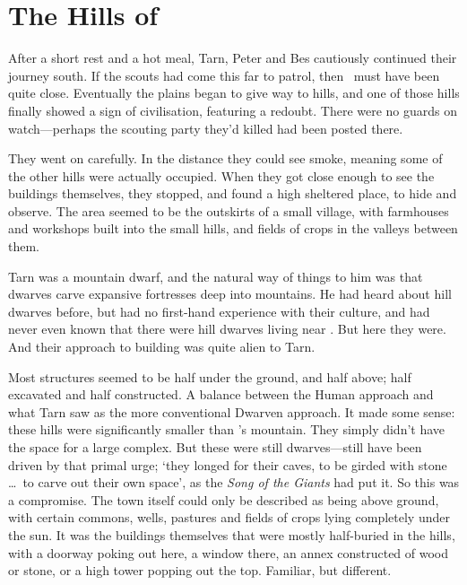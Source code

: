 \chapter{The Hills of \tholkunrond}

After a short rest and a hot meal, Tarn, Peter and Bes cautiously continued their journey south.  If the scouts had come this far to patrol, then \tholkunrond\ must have been quite close.  Eventually the plains began to give way to hills, and one of those hills finally showed a sign of civilisation, featuring a redoubt.  There were no guards on watch---perhaps the scouting party they'd killed had been posted there.

They went on carefully.  In the distance they could see smoke, meaning some of the other hills were actually occupied.  When they got close enough to see the buildings themselves, they stopped, and found a high sheltered place, to hide and observe.  The area seemed to be the outskirts of a small village, with farmhouses and workshops built into the small hills, and fields of crops in the valleys between them.

Tarn was a mountain dwarf, and the natural way of things to him was that dwarves carve expansive fortresses deep into mountains.  He had heard about hill dwarves before, but had no first-hand experience with their culture, and had never even known that there were hill dwarves living near \korbarthrond.  But here they were.  And their approach to building was quite alien to Tarn.

Most structures seemed to be half under the ground, and half above; half excavated and half constructed.  A balance between the Human approach and what Tarn saw as the more conventional Dwarven approach.  It made some sense: these hills were significantly smaller than \korbarthrond's mountain.  They simply didn't have the space for a large complex.  But these were still dwarves---still have been driven by that primal urge; `they longed for their caves, to be girded with stone \ldots\ to carve out their own space', as the \emph{Song of the Giants} had put it.  So this was a compromise.  The town itself could only be described as being above ground, with certain commons, wells, pastures and fields of crops lying completely under the sun.  It was the buildings themselves that were mostly half-buried in the hills, with a doorway poking out here, a window there, an annex constructed of wood or stone, or a high tower popping out the top.  Familiar, but different.

